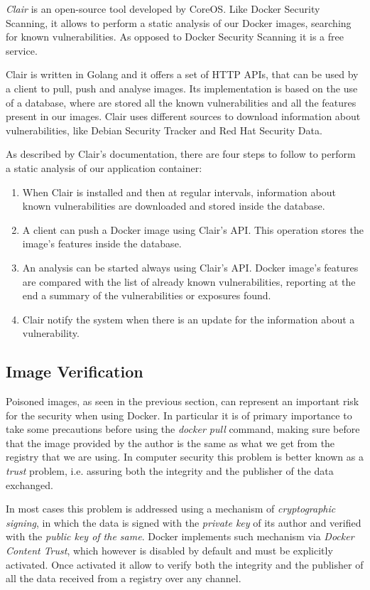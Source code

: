 \documentclass[a4paper,12pt]{article}
\def\ie{i.e.\xspace}
\begin{document}
\textit{Clair} \cite{clair} is an open-source tool developed by CoreOS. Like
Docker Security Scanning, it allows to perform a static analysis of our Docker
images, searching for known vulnerabilities. As opposed to Docker Security
Scanning it is a free service. \par Clair is written in Golang and it offers a
set of HTTP APIs, that can be used by a client to pull, push and analyse images.
Its implementation is based on the use of a database, where are stored all the
known vulnerabilities and all the features present in our images. Clair uses
different sources to download information about vulnerabilities, like Debian
Security Tracker and Red Hat Security Data. \par As described by Clair's
documentation, there are four steps to follow to perform a static analysis of
our application container:
\begin{enumerate}
  \item When Clair is installed and then at regular intervals, information about
  known vulnerabilities are downloaded and stored inside the database.
  \item A client can push a Docker image using Clair's API. This operation
  stores the image's features inside the database.
  \item An analysis can be started always using Clair's API. Docker image's
  features are compared with the list of already known vulnerabilities,
  reporting at the end a summary of the vulnerabilities or exposures found.
  \item Clair notify the system when there is an update for the information
  about a vulnerability.
\end{enumerate}

\subsection{Image Verification}

Poisoned images, as seen in the previous section, can represent an important
risk for the security when using Docker. In particular it is of primary
importance to take some precautions before using the \textit{docker pull}
command, making sure before that the image provided by the author is the same as
what we get from the registry that we are using. In computer security this
problem is better known as a \textit{trust} problem, \ie assuring both the
integrity and the publisher of the data exchanged. \par In most cases this problem
is addressed using a mechanism of \textit{cryptographic signing}, in which the
data is signed with the \textit{private key} of its author and verified with the
\textit{public key of the same}. Docker implements such mechanism via
\textit{Docker Content Trust}, which however is disabled by default and must be
explicitly activated. Once activated it allow to verify both the integrity and
the publisher of all the data received from a registry over any channel.
\end{document}

